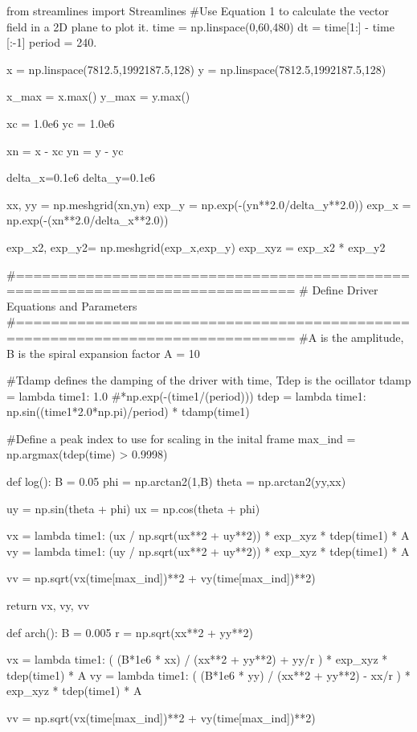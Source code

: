 \begin{pycode}[chapter4]
from streamlines import Streamlines
#Use Equation 1 to calculate the vector field in a 2D plane to plot it.
time = np.linspace(0,60,480)
dt = time[1:] - time [:-1]
period = 240.

x = np.linspace(7812.5,1992187.5,128)
y = np.linspace(7812.5,1992187.5,128)

x_max = x.max()
y_max = y.max()

xc = 1.0e6
yc = 1.0e6

xn = x - xc
yn = y - yc

delta_x=0.1e6
delta_y=0.1e6

xx, yy = np.meshgrid(xn,yn)
exp_y = np.exp(-(yn**2.0/delta_y**2.0))
exp_x = np.exp(-(xn**2.0/delta_x**2.0))

exp_x2, exp_y2= np.meshgrid(exp_x,exp_y)
exp_xyz = exp_x2 * exp_y2


#==============================================================================
# Define Driver Equations and Parameters
#==============================================================================
#A is the amplitude, B is the spiral expansion factor
A = 10

#Tdamp defines the damping of the driver with time, Tdep is the ocillator
tdamp = lambda time1: 1.0 #*np.exp(-(time1/(period)))
tdep = lambda time1: np.sin((time1*2.0*np.pi)/period) * tdamp(time1)

#Define a peak index to use for scaling in the inital frame
max_ind = np.argmax(tdep(time) > 0.9998)

def log():
    B = 0.05
    phi = np.arctan2(1,B)
    theta = np.arctan2(yy,xx)

    uy = np.sin(theta + phi)
    ux =  np.cos(theta + phi)

    vx = lambda time1: (ux / np.sqrt(ux**2 + uy**2)) * exp_xyz * tdep(time1) * A
    vy = lambda time1: (uy / np.sqrt(ux**2 + uy**2)) * exp_xyz * tdep(time1) * A

    vv = np.sqrt(vx(time[max_ind])**2 + vy(time[max_ind])**2)

    return vx, vy, vv

def arch():
    B = 0.005
    r = np.sqrt(xx**2 + yy**2)

    vx = lambda time1: ( (B*1e6 * xx) / (xx**2 + yy**2) + yy/r ) * exp_xyz * tdep(time1) * A
    vy = lambda time1: ( (B*1e6 * yy) / (xx**2 + yy**2) - xx/r ) * exp_xyz * tdep(time1) * A

    vv = np.sqrt(vx(time[max_ind])**2 + vy(time[max_ind])**2)


\end{pycode}
